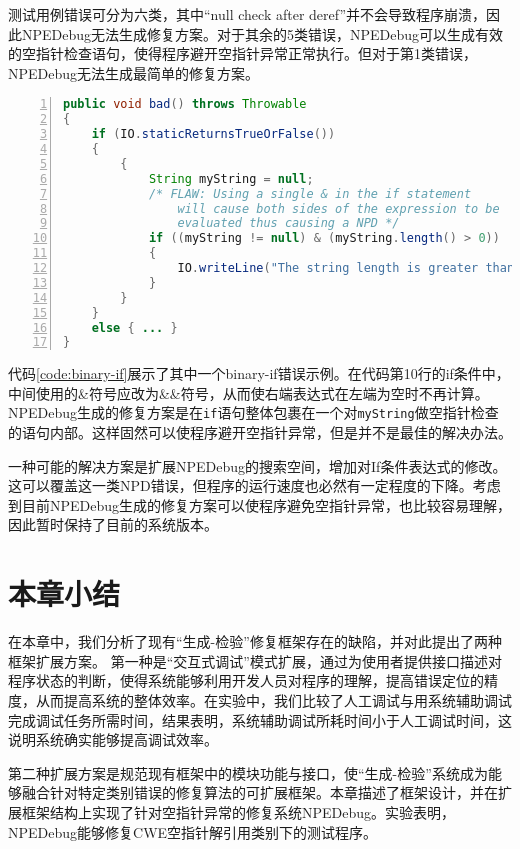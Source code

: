 测试用例错误可分为六类，其中“null check after deref”并不会导致程序崩溃，因此NPEDebug无法生成修复方案。对于其余的5类错误，NPEDebug可以生成有效的空指针检查语句，使得程序避开空指针异常正常执行。但对于第1类错误，NPEDebug无法生成最简单的修复方案。

\begin{lstlisting}[caption=CWE476\_NULL\_Pointer\_Dereference\_\_binary\_if\_12.java,frame=single,language=Java,numbers=left,basicstyle=\ttfamily\footnotesize,label={code:binary-if},tabsize=2]
public void bad() throws Throwable
{	
	if (IO.staticReturnsTrueOrFalse())
	{
		{
			String myString = null;
			/* FLAW: Using a single & in the if statement 
				will cause both sides of the expression to be
				evaluated thus causing a NPD */
			if ((myString != null) & (myString.length() > 0))
			{
				IO.writeLine("The string length is greater than 0");
			}
		}
	}
	else { ... }
}
\end{lstlisting}

代码\ref{code:binary-if}展示了其中一个binary-if错误示例。在代码第10行的if条件中，中间使用的\&符号应改为\&\&符号，从而使右端表达式在左端为空时不再计算。NPEDebug生成的修复方案是在\texttt{if}语句整体包裹在一个对\texttt{myString}做空指针检查的语句内部。这样固然可以使程序避开空指针异常，但是并不是最佳的解决办法。

一种可能的解决方案是扩展NPEDebug的搜索空间，增加对If条件表达式的修改。这可以覆盖这一类NPD错误，但程序的运行速度也必然有一定程度的下降。考虑到目前NPEDebug生成的修复方案可以使程序避免空指针异常，也比较容易理解，因此暂时保持了目前的系统版本。

\section{本章小结}%

在本章中，我们分析了现有“生成-检验”修复框架存在的缺陷，并对此提出了两种框架扩展方案。
第一种是“交互式调试”模式扩展，通过为使用者提供接口描述对程序状态的判断，使得系统能够利用开发人员对程序的理解，提高错误定位的精度，从而提高系统的整体效率。在实验中，我们比较了人工调试与用系统辅助调试完成调试任务所需时间，结果表明，系统辅助调试所耗时间小于人工调试时间，这说明系统确实能够提高调试效率。

第二种扩展方案是规范现有框架中的模块功能与接口，使“生成-检验”系统成为能够融合针对特定类别错误的修复算法的可扩展框架。本章描述了框架设计，并在扩展框架结构上实现了针对空指针异常的修复系统NPEDebug。实验表明，NPEDebug能够修复CWE空指针解引用类别下的测试程序。




















